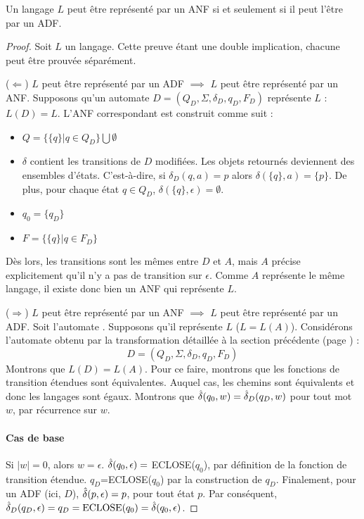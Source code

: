 \begin{theorem}\label{anf-dnf}
	Un langage $L$ peut être représenté par un ANF si et seulement si il peut l'être par un ADF.
\end{theorem}

\begin{proof}
	 Soit $L$ un langage. Cette preuve étant une double implication, chacune peut être prouvée séparément.

	($\Leftarrow$) $L$ peut être représenté par un ADF $\implies$ $L$ peut être représenté par un ANF. Supposons qu'un automate $D=(Q_D, \Sigma, \delta_D, q_D, F_D)$ représente $L$ : $L(D)=L$.
	L'ANF \automaton correspondant est construit comme suit :

	\begin{itemize}
		\item $Q=\{\{q\}|q\in Q_D\}\bigcup\emptyset$
		\item $\delta$ contient les transitions de $D$ modifiées. Les objets retournés deviennent des ensembles d'états. C'est-à-dire, si $\delta_D(q,a)=p$ alors $\delta(\{q\},a)=\{p\}$. De plus, pour chaque état $q\in Q_D$, $\delta(\{q\},\epsilon)=\emptyset$.
		\item $q_0=\{q_D\}$
		\item $F=\{\{q\}| q\in F_D\}$
	\end{itemize}

	 Dès lors, les transitions sont les mêmes entre $D$ et $A$, mais $A$ précise explicitement qu'il n'y a pas de transition sur $\epsilon$. Comme $A$ représente le même langage, il existe donc bien un ANF qui représente $L$.


	($\Rightarrow$) $L$ peut être représenté par un ANF $\implies$ $L$ peut être représenté par un ADF. Soit l'automate \automaton. Supposons qu'il représente $L$ ($L=L(A)$). Considérons l'automate obtenu par la transformation détaillée à la section précédente (page \pageref{ex:anfadf}) :
	$$
	D=(Q_D, \Sigma, \delta_D, q_D, F_D)
	$$
	Montrons que $L(D)=L(A)$. Pour ce faire, montrons que les fonctions de transition étendues sont équivalentes. Auquel cas, les chemins sont équivalents et donc les langages sont égaux.
	Montrons que $\hat{\delta}(q_0,w)=\hat{\delta}_D(q_D,w)$ pour tout mot $w$, par récurrence sur $w$.

	\paragraph{Cas de base} Si $|w|=0$, alors $w=\epsilon$. $\hat{\delta}(q_0,\epsilon)=$ ECLOSE($q_0$), par définition de la fonction de transition étendue. $q_D$=ECLOSE($q_0$) par la construction de $q_D$. Finalement, pour un ADF (ici, $D$), $\hat{\delta}(p,\epsilon)=p$, pour tout état $p$. Par conséquent, $\hat{\delta}_D(q_D,\epsilon)=q_D=\text{ECLOSE(}q_0\text{)}=\hat{\delta}(q_0,\epsilon)$.


\end{proof}
